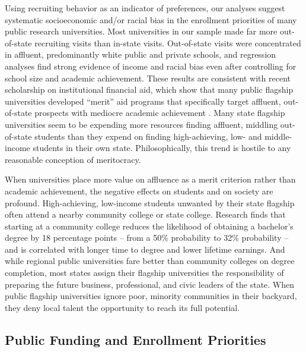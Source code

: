 \documentclass{article}
\begin{document}
Using recruiting behavior as an indicator of preferences, our analyses suggest systematic socioeconomic and/or racial bias in the enrollment priorities of many public research universities. Most universities in our sample made far more out-of-state recruiting visits than in-state visits.  Out-of-state visits were concentrated in affluent, predominantly white public and private schools, and regression analyses find strong evidence of income and racial bias even after controlling for school size and academic achievement. These results are consistent with recent scholarship on institutional financial aid, which show that many public flagship universities developed ``merit'' aid programs that specifically target affluent, out-of-state prospects with mediocre academic achievement \citep{RN4409, RN4032, RN3519, RN3762, RN4494}. Many state flagship universities seem to be expending more resources finding affluent, middling out-of-state students than they expend on finding high-achieving, low- and middle-income students in their own state. Philosophically, this trend is hostile to any reasonable conception of meritocracy.

When universities place more value on affluence as a merit criterion rather than academic achievement, the negative effects on students and on society are profound. High-achieving, low-income students unwanted by their state flagship often attend a nearby community college or state college. Research finds that starting at a community college reduces the likelihood of obtaining a bachelor’s degree by 18 percentage points -- from a 50\% probability to 32\% probability \citep{RN4469_alt, RN2261} -- and is correlated with longer time to degree and lower lifetime earnings. And while regional public universities fare better than community colleges on degree completion, most states assign their flagship universities the responsibility of preparing the future business, professional, and civic leaders of the state. When public flagship universities ignore poor, minority communities in their backyard, they deny local talent the opportunity to reach its full potential. 

\subsection*{Public Funding and Enrollment Priorities}
\end{document}
